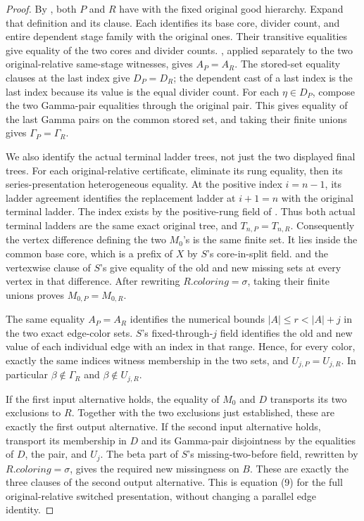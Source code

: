 \begin{proof}
By , both \(P\) and \(R\)
have  with the fixed original good
hierarchy. Expand that definition and its 
clause. Each identifies its base core, divider count, and entire
dependent stage family with the original ones. Their transitive
equalities give equality of the two cores and divider counts.
, applied separately to the two
original-relative same-stage witnesses, gives \(A_P=A_R\).
The stored-set equality clauses at the last index give \(D_P=D_R\);
the dependent cast of a last index is the last index because its value
is the equal divider count. For each \(\eta\in D_P\), compose the
two Gamma-pair equalities through the original pair. This gives equality
of the last Gamma pairs on the common stored set, and taking their
finite unions gives \(\Gamma_P=\Gamma_R\).

We also identify the actual terminal ladder trees, not just the two
displayed final trees. For each original-relative
 certificate, eliminate
its rung equality, then its series-presentation heterogeneous equality.
At the positive index \(i=n-1\), its ladder agreement identifies the
replacement ladder at \(i+1=n\) with the original terminal ladder.
The index exists by the positive-rung field of
. Thus both actual terminal ladders
are the same exact original tree, and \(T_{n,P}=T_{n,R}\).
Consequently the vertex difference defining the two \(M_0\)'s is
the same finite set. It lies inside the common base core, which is a
prefix of \(X\) by \(S\)'s core-in-split field.
 and the
vertexwise clause of \(S\)'s 
give equality of the old and new missing sets at every vertex in that
difference. After rewriting \(R.\mathit{coloring}=\sigma\), taking
their finite unions proves \(M_{0,P}=M_{0,R}\).

The same equality \(A_P=A_R\) identifies the numerical bounds
\(|A|\le r<|A|+j\) in the two exact edge-color sets.
\(S\)'s fixed-through-\(j\) field identifies the old and new value
of each individual edge with an index in that range.
Hence, for every color, exactly the same indices witness membership in
the two sets, and \(U_{j,P}=U_{j,R}\).
In particular \(\beta\notin\Gamma_R\) and
\(\beta\notin U_{j,R}\).

If the first input alternative holds, the equality of \(M_0\) and
\(D\) transports its two exclusions to \(R\). Together with the
two exclusions just established, these are exactly the first output
alternative.
If the second input alternative holds, transport its membership in
\(D\) and its Gamma-pair disjointness by the equalities of \(D\),
the pair, and \(U_j\). The beta part of \(S\)'s
missing-two-before field, rewritten by \(R.\mathit{coloring}=\sigma\),
gives the required new missingness on \(B\). These are exactly the
three clauses of the second output alternative.
This is equation (9) for the full original-relative switched
presentation, without changing a parallel edge identity.
\end{proof}
